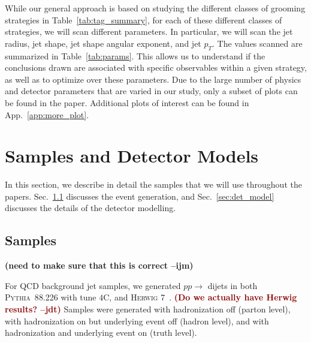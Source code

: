 \documentclass[11pt,letterpaper]{article}
\newcommand{\pythia}{\textsc{Pythia~8}\xspace}
\DeclareRobustCommand{\Sec}[1]{Sec.~\ref{#1}}
\DeclareRobustCommand{\App}[1]{App.~\ref{#1}}
\DeclareRobustCommand{\Tab}[1]{Table~\ref{#1}}
\newcommand{\jdt}[1]{\textbf{\textcolor{darkred}{(#1 --jdt)}}}
\newcommand{\ijm}[1]{\textbf{\textcolor{llblue}{(#1 --ijm)}}}
\begin{document}
While our general approach is based on studying the different classes of grooming strategies in \Tab{tab:tag_summary}, for each of these different classes of strategies, we will scan different parameters.
%
In particular, we will scan the jet radius, jet shape, jet shape angular exponent, and jet $p_T$.
%
The values scanned are summarized in \Tab{tab:params}.
%
This allows us to understand if the conclusions drawn are associated with specific observables within a given strategy, as well as to optimize over these parameters.
%
Due to the large number of physics and detector parameters that are varied in our study, only a subset of plots can be found in the paper.
%
Additional plots of interest can be found in \App{app:more_plot}.















\section{Samples and Detector Models}\label{sec:samples}

In this section, we describe in detail the samples that we will use throughout the papers.
%
\Sec{sec:samples_sub} discusses the event generation, and \Sec{sec:det_model} discusses the details of the detector modelling. 

\subsection{Samples}\label{sec:samples_sub}

\ijm{need to make sure that this is correct}

For QCD background jet samples, we generated $pp\to$ dijets in both \pythia{8.226} \cite{Sjostrand:2006za,Sjostrand:2007gs} with tune $4$C, and \textsc{Herwig} 7~\cite{Bahr:2008pv,Bellm:2015jjp}.  \jdt{Do we actually have Herwig results?}
%
Samples were generated with hadronization off (parton level), with hadronization on but underlying event off (hadron level), and with hadronization and underlying event on (truth level).
\end{document}
